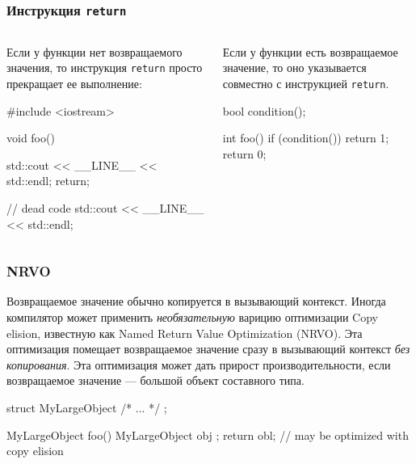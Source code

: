 \documentclass[compress, 8pt]{beamer}
\begin{document}
\begin{frame}[fragile]

    \frametitle{Инструкция \texttt{return}}

    \begin{columns}[T]

        \begin{column}{0.5\textwidth}

            Если у функции нет возвращаемого значения, то инструкция \verb|return|
            просто прекращает ее выполнение:

            \begin{myinplacelisting}[minted language=cpp]
#include <iostream>

void foo() {
    std::cout << __LINE__
        << std::endl;
    return;

    // dead code
    std::cout << __LINE__
        << std::endl;
}
            \end{myinplacelisting}

        \end{column}

        \begin{column}{0.5\textwidth}

            Если у функции есть возвращаемое значение, то оно указывается
            совместно с инструкцией \verb|return|.

            \begin{myinplacelisting}[minted language=cpp]
bool condition();

int foo() {
    if (condition()) {
        return 1;
    }
    return 0;
}
            \end{myinplacelisting}

        \end{column}

    \end{columns}

\end{frame}

\begin{frame}[fragile]

    \frametitle{NRVO}

    Возвращаемое значение обычно копируется в вызывающий контекст.
    Иногда компилятор может применить \textit{необязательную} варицию оптимизации
    Copy elision, известную как Named Return Value Optimization (NRVO).
    Эта оптимизация помещает возвращаемое значение сразу в вызывающий контекст
    \textit{без копирования}.
    Эта оптимизация может дать прирост производительности, если возвращаемое значение
    --- большой объект составного типа.

    \begin{myinplacelisting}[minted language=cpp]
struct MyLargeObject { /* ... */ };

MyLargeObject foo() {
    MyLargeObject obj {};
    return obl; // may be optimized with copy elision
}
    \end{myinplacelisting}

\end{frame}
\end{document}
